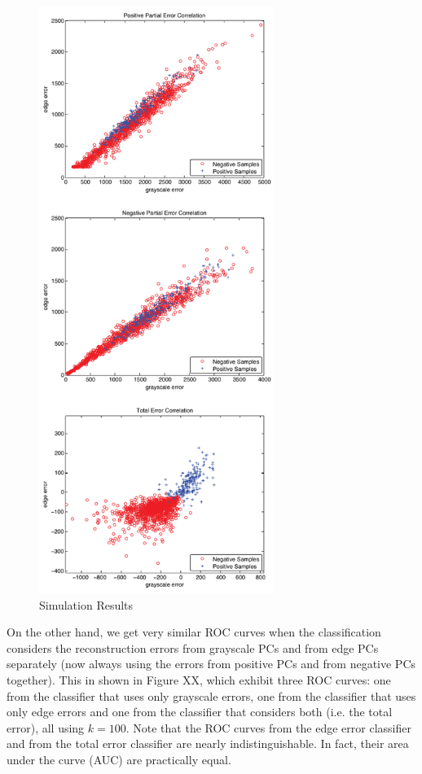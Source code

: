 \documentclass[10pt, conference, compsocconf]{IEEEtran}
\begin{document}
\begin{figure}[t]
\centering
\includegraphics[width=3in]{dist_pos_vs_neg}
\caption{Simulation Results}
\label{dist_pos_vs_neg}
\end{figure}

On the other hand, we get very similar ROC curves when the classification considers the reconstruction errors from grayscale PCs and from edge PCs separately (now always using the errors from positive PCs and from negative PCs together). This in shown in Figure XX, which exhibit three ROC curves: one from the classifier that uses only grayscale errors, one from the classifier that uses only edge errors and one from the classifier that considers both (i.e. the total error), all using $k = 100$. Note that the ROC curves from the edge error classifier and from the total error classifier are nearly indistinguishable. In fact, their area under the curve (AUC) are practically equal.
\end{document}
